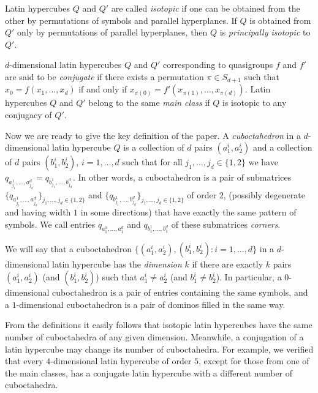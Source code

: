 \documentclass[a4paper]{article}
\begin{document}
Latin hypercubes  $Q$ and $Q'$ are called \textit{isotopic} if one can be obtained from the other by permutations of  symbols and parallel hyperplanes. If $Q$ is obtained from $Q'$ only  by permutations of parallel hyperplanes, then $Q$ is \textit{principally isotopic} to $Q'$.

$d$-dimensional latin hypercubes $Q$ and $Q'$ corresponding to quasigroups $f$ and $f'$ are said to be \textit{conjugate} if  there exists a permutation $\pi \in S_{d+1}$ such that $x_0 = f(x_1, \ldots, x_d)$ if and only if $x_{\pi(0)} = f' (x_{\pi(1)}, \ldots, x_{\pi(d)})$.    Latin   hypercubes  $Q$ and  $Q'$   belong to the same \textit{main class}  if $Q$ is isotopic to any conjugacy of $Q'$.  


Now we are ready to give the key definition of the paper. 
A \textit{cuboctahedron} in a $d$-dimensional  latin hypercube $Q$ is a collection  of $d$ pairs $(a_1^{i}, a_2^{i})$ and a   collection  of $d$ pairs $(b_1^{i}, b_2^{i})$, $i = 1, \ldots, d$ such that for all $j_1, \ldots, j_d \in \{1,2\}$ we have $q_{a_{j_1}^1, \ldots, a_{j_d}^d } = q_{b_{j_1}^1, \ldots, b_{j_d}^d } $. In other words, a cuboctahedron is a  pair of submatrices $\{ q_{a_{j_1}^1, \ldots, a_{j_d}^d } \}_{j_1, \ldots, j_d \in \{1,2\}}$  and   $\{ q_{b_{j_1}^1, \ldots, b_{j_d}^d } \}_{j_1, \ldots, j_d \in \{1,2\}}$   of order $2$,  (possibly degenerate and having width $1$ in some directions)   that have exactly the same  pattern of symbols.  We call entries   $q_{a_{1}^1, \ldots, a_{1}^d } $ and $q_{b_{1}^1, \ldots, b_{1}^d }$   of these submatrices    \textit{corners}.   


We will say that a cuboctahedron  $\{ (a_1^{i}, a_2^{i}), (b_1^{i}, b_2^{i}) : i = 1, \ldots, d \}$ in a $d$-dimensional latin hypercube has the \textit{dimension} $k$ if there are exactly $k$ pairs $(a_1^{i}, a_2^{i})$ (and $(b_1^{i}, b_2^{i})$) such that $a_1^{i} \neq a_2^{i} $ (and $b_1^{i} \neq b_2^{i}$). In particular, a $0$-dimensional cuboctahedron is a pair of entries containing the same symbols, and a $1$-dimensional cuboctahedron is  a pair of dominos filled in the same way. 


From  the definitions  it easily follows   that isotopic latin hypercubes have the same number of cuboctahedra of any given dimension.  Meanwhile, a conjugation of a latin hypercube may change its number of cuboctahedra. For example, we verified that every $4$-dimensional latin hypercube of order $5$, except for those from one of the main classes, has a conjugate latin hypercube with a different number of cuboctahedra. 
\end{document}
